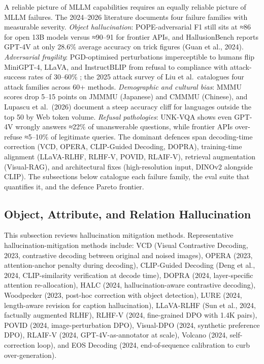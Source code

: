 \documentclass{article}
\begin{document}
A reliable picture of MLLM capabilities requires an equally reliable picture of MLLM failures. The 2024--2026 literature documents four failure families with measurable severity. \emph{Object hallucination}: POPE-adversarial F1 still sits at ≈86 for open 13B models versus ≈90--91 for frontier APIs, and HallusionBench reports GPT-4V at only 28.6\% average accuracy on trick figures (Guan et al., 2024). \emph{Adversarial fragility}: PGD-optimised perturbations imperceptible to humans flip MiniGPT-4, LLaVA, and InstructBLIP from refusal to compliance with attack-success rates of 30--60\% \citep{qi20242024}; the 2025 attack survey of Liu et al.~catalogues four attack families across 60+ methods. \emph{Demographic and cultural bias}: MMMU scores drop 5--15 points on JMMMU (Japanese) and CMMMU (Chinese), and Lupascu et al.~(2026) document a steep accuracy cliff for languages outside the top 50 by Web token volume. \emph{Refusal pathologies}: UNK-VQA \citep{guo20242024} shows even GPT-4V wrongly answers ≈22\% of unanswerable questions, while frontier APIs over-refuse ≈5--10\% of legitimate queries. The dominant defences span decoding-time correction (VCD, OPERA, CLIP-Guided Decoding, DOPRA), training-time alignment (LLaVA-RLHF, RLHF-V, POVID, RLAIF-V), retrieval augmentation (Visual-RAG), and architectural fixes (high-resolution input, DINOv2 alongside CLIP). The subsections below catalogue each failure family, the eval suite that quantifies it, and the defence Pareto frontier.

\subsection{Object, Attribute, and Relation Hallucination}\label{object-attribute-and-relation-hallucination}

This subsection reviews hallucination mitigation methods. Representative hallucination-mitigation methods include: VCD (Visual Contrastive Decoding, 2023, contrastive decoding between original and noised images), OPERA (2023, attention-anchor penalty during decoding), CLIP-Guided Decoding (Deng et al., 2024, CLIP-similarity verification at decode time), DOPRA (2024, layer-specific attention re-allocation), HALC (2024, hallucination-aware contrastive decoding), Woodpecker (2023, post-hoc correction with object detection), LURE (2024, length-aware revision for caption hallucination), LLaVA-RLHF (Sun et al., 2024, factually augmented RLHF), RLHF-V (2024, fine-grained DPO with 1.4K pairs), POVID (2024, image-perturbation DPO), Visual-DPO (2024, synthetic preference DPO), RLAIF-V (2024, GPT-4V-as-annotator at scale), Volcano (2024, self-correction loop), and EOS Decoding (2024, end-of-sequence calibration to curb over-generation).
\end{document}
